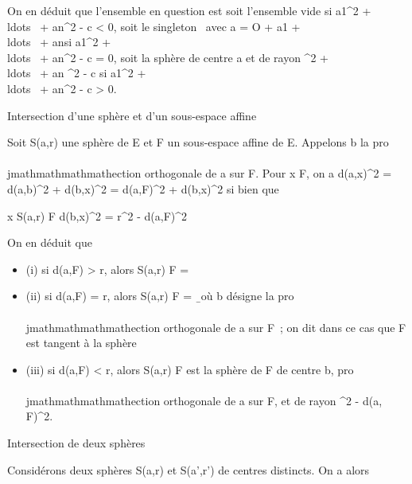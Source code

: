 On en déduit que l'ensemble en question est soit l'ensemble vide si
a1^2 +
\\ldots~ +
an^2 - c \textless{} 0, soit le singleton
\a\ avec a = O +
a1 +
\\ldots~ +
an\vecen si a1^2
+ \\ldots~ +
an^2 - c = 0, soit la sphère de centre a et de rayon
 ^2  +
\\ldots~ +
an ^2  - c si a1^2 +
\\ldots~ +
an^2 - c \textgreater{} 0.

Intersection d'une sphère et d'un sous-espace affine

Soit S(a,r) une sphère de E et F un sous-espace affine de E. Appelons b
la pro\\\\jmathmathmathmathection orthogonale de a sur F. Pour x \in F, on a
d(a,x)^2 = d(a,b)^2 + d(b,x)^2 =
d(a,F)^2 + d(b,x)^2 si bien que

x \in S(a,r) \bigcap F \Leftrightarrow d(b,x)^2 =
r^2 - d(a,F)^2

On en déduit que

\begin{itemize}
\itemsep1pt\parskip0pt
\item
  (i) si d(a,F) \textgreater{} r, alors S(a,r) \bigcap F = \varnothing~
\item
  (ii) si d(a,F) = r, alors S(a,r) \bigcap F =
  \b\ où b désigne la pro\\\\jmathmathmathmathection
  orthogonale de a sur F~; on dit dans ce cas que F est tangent à la
  sphère
\item
  (iii) si d(a,F) \textless{} r, alors S(a,r) \bigcap F est la sphère de F de
  centre b, pro\\\\jmathmathmathmathection orthogonale de a sur F, et de rayon
  \sqrtr^2  - d(a, F)^2.
\end{itemize}

Intersection de deux sphères

Considérons deux sphères S(a,r) et S(a',r') de centres distincts. On a
alors

